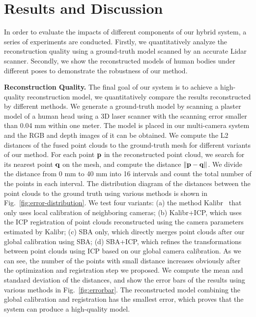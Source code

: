 
\section{Results and Discussion}
\label{sec:Results}

In order to evaluate the impacts of different components of our hybrid system, a series of experiments are conducted. Firstly, we quantitatively analyze the reconstruction quality using a ground-truth model scanned by an accurate Lidar scanner.
Secondly, we show the reconstructed models of human bodies under different poses to demonstrate the robustness of our method.




\noindent\textbf{Reconstruction Quality.}
The final goal of our system is to achieve a high-quality reconstruction model, we quantitatively compare the results reconstructed by different methods.
%
We generate a ground-truth model by scanning a plaster model of a human head using a 3D laser scanner with the scanning error smaller than 0.04 mm within one meter.
%
The model is placed in our multi-camera system and the RGB and depth images of it can be obtained.
We compute the L2 distances of the fused point clouds to the ground-truth mesh for different variants of our method.
For each point $\mathbf{p}$ in the reconstructed point cloud, we search for its nearest point $\mathbf{q}$ on the mesh, and compute the distance $\|\mathbf{p}-\mathbf{q}\|$.
%
We divide the distance from 0 mm to 40 mm into 16 intervals and count the total number of the points in each interval. The distribution diagram of the distances between the point clouds to the ground truth using various methods is shown in Fig.~\ref{fig:error-distribution}.
%
We test four variants: (a) the method Kalibr~\cite{Maye2013Self} that only uses local calibration of neighboring cameras; (b) Kalibr+ICP, which uses the ICP registration of point clouds reconstructed using the camera parameters estimated by Kalibr; (c) SBA only, which directly merges point clouds after our global calibration using SBA; (d) SBA+ICP, which refines the transformations between point clouds using ICP based on our global camera calibration.
%
As we can see, the number of the points with small distance increases obviously after the optimization and registration step we proposed. We compute the mean and standard deviation of the distances, and show the error bars of the results using various methods in Fig.~\ref{fig:errorbar}. The reconstructed model combining the global calibration and registration has the smallest error, which proves that the system can produce a high-quality model.



